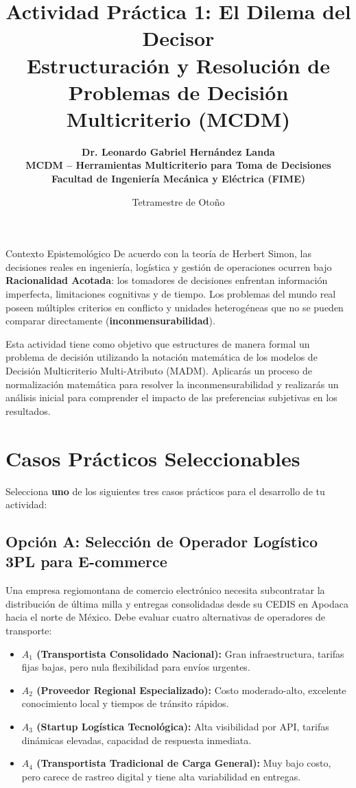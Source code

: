 \documentclass[11pt,a4paper]{article}
\title{%
  \sffamily\bfseries\color{UANLblue}%
  Actividad Práctica 1: El Dilema del Decisor\\
  \large Estructuración y Resolución de Problemas de Decisión Multicriterio (MCDM)
}
\author{%
  \sffamily\bfseries\color{FIMEdarkgray}%
  Dr. Leonardo Gabriel Hernández Landa\\
  \small MCDM -- Herramientas Multicriterio para Toma de Decisiones\\
  \small\color{FIMEgreen}Facultad de Ingeniería Mecánica y Eléctrica (FIME)
}
\date{\sffamily Tetramestre de Otoño}
\begin{document}
\maketitle
\thispagestyle{fancy}

\begin{brandbox}{Contexto Epistemológico}
  De acuerdo con la teoría de Herbert Simon, las decisiones reales en ingeniería, logística y gestión de operaciones ocurren bajo \textbf{Racionalidad Acotada}: los tomadores de decisiones enfrentan información imperfecta, limitaciones cognitivas y de tiempo. Los problemas del mundo real poseen múltiples criterios en conflicto y unidades heterogéneas que no se pueden comparar directamente (\textbf{inconmensurabilidad}).
  
  Esta actividad tiene como objetivo que estructures de manera formal un problema de decisión utilizando la notación matemática de los modelos de Decisión Multicriterio Multi-Atributo (MADM). Aplicarás un proceso de normalización matemática para resolver la inconmensurabilidad y realizarás un análisis inicial para comprender el impacto de las preferencias subjetivas en los resultados.
\end{brandbox}

\section{Casos Prácticos Seleccionables}
Selecciona \textbf{uno} de los siguientes tres casos prácticos para el desarrollo de tu actividad:

\subsection*{Opción A: Selección de Operador Logístico 3PL para E-commerce}
Una empresa regiomontana de comercio electrónico necesita subcontratar la distribución de última milla y entregas consolidadas desde su CEDIS en Apodaca hacia el norte de México. Debe evaluar cuatro alternativas de operadores de transporte:
\begin{itemize}
  \item \textbf{$A_1$ (Transportista Consolidado Nacional):} Gran infraestructura, tarifas fijas bajas, pero nula flexibilidad para envíos urgentes.
  \item \textbf{$A_2$ (Proveedor Regional Especializado):} Costo moderado-alto, excelente conocimiento local y tiempos de tránsito rápidos.
  \item \textbf{$A_3$ (Startup Logística Tecnológica):} Alta visibilidad por API, tarifas dinámicas elevadas, capacidad de respuesta inmediata.
  \item \textbf{$A_4$ (Transportista Tradicional de Carga General):} Muy bajo costo, pero carece de rastreo digital y tiene alta variabilidad en entregas.
\end{itemize}
\end{document}
